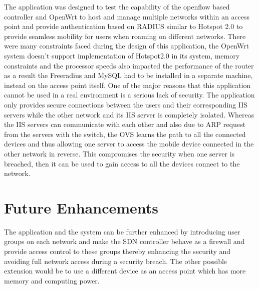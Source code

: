 The application was designed to test the capability of the openflow based controller and OpenWrt to host and manage multiple networks within an access point and provide authentication based on RADIUS similar to Hotspot 2.0 to provide seamless mobility for users when roaming on different networks. There were many constraints faced during the design of this application, the OpenWrt system doesn’t support implementation of Hotspot2.0 in its system, memory constraints and the processor speeds also impacted the performance of the router as a result the Freeradius and MySQL had to be installed in a separate machine, instead on the access point itself. One of the major reasons that this application cannot be used in a real environment is a serious lack of security. The application only provides secure connections between the users and their corresponding IIS servers while the other network and its IIS server is completely isolated. Whereas the IIS servers can communicate with each other and also due to ARP request from the servers with the switch, the OVS learns the path to all the connected devices and thus allowing one server to access the mobile device connected in the other network in reverse. This compromises the security when one server is breached, then it can be used to gain access to all the devices connect to the network.

\section{Future Enhancements}
The application and the system can be further enhanced by introducing user groups on each network and make the SDN controller behave as a firewall and provide access control to these groups thereby enhancing the security and avoiding full network access during a security breach. The other possible extension would be to use a different device as an access point which has more memory and computing power.